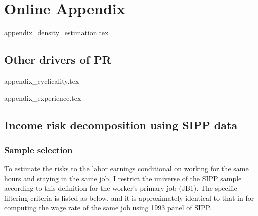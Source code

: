 \pagebreak 

\appendix
\setcounter{figure}{0} \renewcommand{\thefigure}{A.\arabic{figure}}
\setcounter{table}{0} \renewcommand{\thetable}{A.\arabic{table}}
\section{Online Appendix}
\label{sec:appendix}

{appendix_density_estimation.tex}

\subsection{Other drivers of PR}

{appendix_cyclicality.tex}

{appendix_experience.tex}


\subsection{Income risk decomposition using SIPP data}
\label{appendix:sipp_data}
\subsubsection{Sample selection}

To estimate the risks to the labor earnings conditional on working for the same hours and staying in the same job, I restrict the universe of the SIPP sample according to this definition for the worker's primary job (JB1). The specific filtering criteria is listed as below, and it is approximately identical to that in \cite{low2010wage} for computing the wage rate of the same job using 1993 panel of SIPP. 

